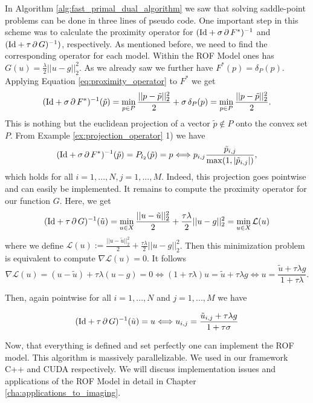         In Algorithm \ref{alg:fast_primal_dual_algorithm} we saw that solving saddle-point problems can be done in three lines of pseudo code. One important step in this scheme was to calculate the proximity operator for $(\textnormal{Id} + \sigma\,\partial\,F^{\ast})^{-1}$ and $(\textnormal{Id} + \tau\,\partial\,G)^{-1})$, respectively. As mentioned before, we need to find the corresponding operator for each model. Within the ROF Model ones has $G(u) = \frac{\lambda}{2} ||u - g||_{2}^{2}$. As we already saw we further have $F^{\ast}(p) = \delta_{P}(p)$. Applying Equation \ref{eq:proximity_operator} to $F^{\ast}$ we get
            $$
                (\textnormal{Id} + \sigma\,\partial\,F^{\ast})^{-1}(\tilde{p}) = \min_{p \in P} \frac{||p - \tilde{p}||_{2}^{2}}{2} + \sigma\,\delta_{P}(p) = \min_{p \in P} \frac{||p - \tilde{p}||_{2}^{2}}{2}.
            $$
        This is nothing but the euclidean projection of a vector $\tilde{p} \notin P$ onto the convex set $P$. From Example \ref{ex:projection_operator} 1) we have
            \begin{equation}
                (\textnormal{Id} + \sigma\,\partial\,F^{\ast})^{-1}(\tilde{p}) = P_{l_{2}}(\tilde{p}) = p \Longleftrightarrow p_{i,j} \frac{\tilde{p}_{i, j}}{\max(1, |\tilde{p}_{i, j}|)},
            \label{eq:proximity_operator_f_star_rof}
            \end{equation}
        which holds for all $i = 1, ..., N, j = 1, ..., M$. Indeed, this projection goes pointwise and can easily be implemented. It remains to compute the proximity operator for our function $G$. Here, we get
            $$
                (\textnormal{Id} + \tau\,\partial\,G)^{-1}(\tilde{u}) = \min_{u \in X} \frac{||u - \tilde{u}||_{2}^{2}}{2} + \frac{\tau\lambda}{2} ||u - g||_{2}^{2} = \min_{u \in X} \mathcal{L}(u)
            $$
        where we define $\mathcal{L}(u) := \frac{||u - \tilde{u}||_{2}^{2}}{2} + \frac{\tau\lambda}{2} ||u - g||_{2}^{2}$. Then this minimization problem is equivalent to compute $\nabla\mathcal{L}(u) = 0$. It follows
            $$
                \nabla\mathcal{L}(u) = (u - \tilde{u}) + \tau\lambda (u - g) = 0 \Longleftrightarrow (1 + \tau\lambda)u = \tilde{u} + \tau\lambda g \Longleftrightarrow u = \frac{\tilde{u} + \tau\lambda g}{1 + \tau\lambda}.
            $$

        Then, again pointwise for all $i = 1, ..., N$ and $j = 1, ..., M$ we have

            \begin{equation}
                (\textnormal{Id} + \tau\,\partial\,G)^{-1}(\tilde{u}) = u \Longleftrightarrow u_{i,j} = \frac{\tilde{u}_{i,j} + \tau\lambda g}{1 + \tau\sigma}
            \label{eq:proximity_operator_g_rof}
            \end{equation}


    Now, that everything is defined and set perfectly one can implement the ROF model. This algorithm is massively parallelizable. We used in our framework C++ and CUDA respectively. We will discuss implementation issues and applications of the ROF Model in detail in Chapter \ref{cha:applications_to_imaging}.

